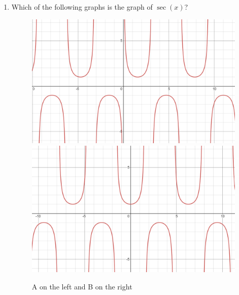 \documentclass{ximera}
\begin{document}
\begin{exercise}
\begin{enumerate}
\item Which of the following graphs is the graph of $\sec(x)$?
\begin{figure}[!h]
\begin{image}
\includegraphics{ex8-a.png}
\hspace{20mm}
\includegraphics{ex8-b.png}

\end{image}
\caption{A on the left and B on the right}
\end{figure}


\end{enumerate}
\end{exercise}
\end{document}
